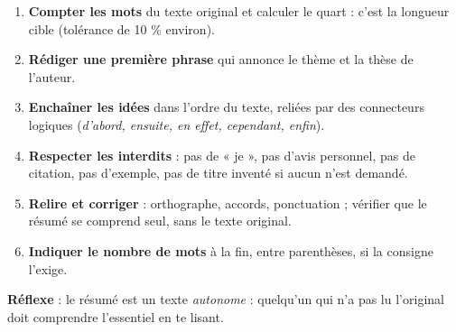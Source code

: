 \documentclass[11pt]{article}
\begin{document}
\begin{methode}
\begin{enumerate}
\item \textbf{Compter les mots} du texte original et calculer le quart : c'est la longueur cible (tolérance de 10 \% environ).
\item \textbf{Rédiger une première phrase} qui annonce le thème et la thèse de l'auteur.
\item \textbf{Enchaîner les idées} dans l'ordre du texte, reliées par des connecteurs logiques (\emph{d'abord, ensuite, en effet, cependant, enfin}).
\item \textbf{Respecter les interdits} : pas de « je », pas d'avis personnel, pas de citation, pas d'exemple, pas de titre inventé si aucun n'est demandé.
\item \textbf{Relire et corriger} : orthographe, accords, ponctuation ; vérifier que le résumé se comprend seul, sans le texte original.
\item \textbf{Indiquer le nombre de mots} à la fin, entre parenthèses, si la consigne l'exige.
\end{enumerate}
\textbf{Réflexe} : le résumé est un texte \emph{autonome} : quelqu'un qui n'a pas lu l'original doit comprendre l'essentiel en te lisant.
\end{methode}
\end{document}
